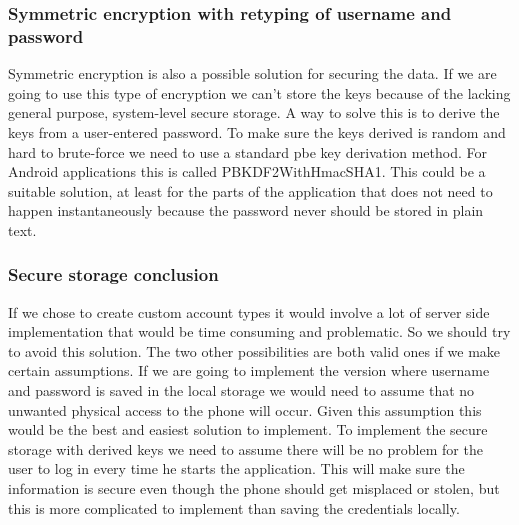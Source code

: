\subsubsection{Symmetric encryption with retyping of username and password}
Symmetric encryption is also a possible solution for securing the data. If we are going to use this type of encryption we can’t store the keys because of the lacking general purpose, system-level secure storage.
\newline
\newline
A way to solve this is to derive the keys from a user-entered password. To make sure the keys derived is random and hard to brute-force we need to use a standard \gls{pbe} key derivation method. For Android applications this is called PBKDF2WithHmacSHA1.
\newline
\newline
This could be a suitable solution, at least for the parts of the application that does not need to happen instantaneously because the password never should be stored in plain text.

\subsubsection{Secure storage conclusion}
If we chose to create custom account types it would involve a lot of server side implementation that would be time consuming and problematic. So we should try to avoid this solution. The two other possibilities are both valid ones if we make certain assumptions.
\newline
\newline
If we are going to implement the version where username and password is saved in the local storage we would need to assume that no unwanted physical access to the phone will occur. Given this assumption this would be the best and easiest solution to implement.
\newline
\newline
To implement the secure storage with derived keys we need to assume there will be no problem for the user to log in every time he starts the application. This will make sure the information is secure even though the phone should get misplaced or stolen, but this is more complicated to implement than saving the credentials locally.


